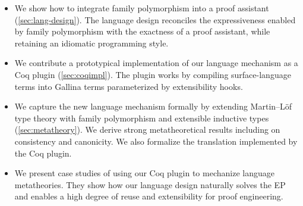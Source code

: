 \begin{itemize}[leftmargin=3.5ex]

\item We show how to integrate family polymorphism into a proof
assistant (\cref{sec:lang-design}).
The language design reconciles the expressiveness enabled by
family polymorphism with the exactness of a proof assistant,
while retaining an idiomatic programming style.

\item We contribute a prototypical implementation of our language
mechanism as a Coq plugin (\cref{sec:coqimpl}). The plugin works by
compiling surface-language terms into Gallina terms parameterized by
extensibility hooks.

\item We capture the new language mechanism formally by extending
Martin–Löf type theory with family polymorphism and extensible inductive
types (\cref{sec:metatheory}).
We derive strong meta\-theoretical results including on consistency and
canonicity.
We also formalize the translation implemented by the Coq plugin.

\item We present case studies of using our Coq plugin to mechanize
language metatheories.
They show how our language design naturally solves the EP and
enables a high degree of reuse and extensibility
for proof engineering.

\end{itemize}



